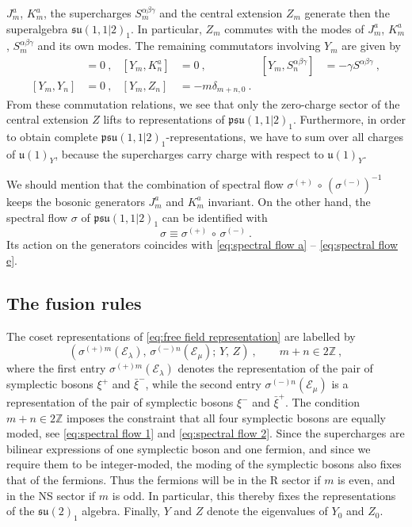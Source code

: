 \documentclass[12pt,a4paper]{article}
\newcommand{\be}{\begin{equation}}
\newcommand{\ee}{\end{equation}}
\begin{document}
$J^a_m$, $K^a_m$, the supercharges $S^{\alpha\beta\gamma}_m$ and the central extension $Z_m$ generate then the superalgebra $\mathfrak{su}(1,1|2)_1$. In particular, $Z_m$ commutes with the modes of $J^a_m$, $K^a_m$, $S^{\alpha\beta\gamma}_m$ and its own modes.
The remaining commutators involving $Y_m$ are given by
\begin{align}
[Y_m,J^a_n]&=0\ , & [Y_m,K^a_n]&=0\ , & [Y_m,S^{\alpha\beta\gamma}_n]&=-\gamma S^{\alpha\beta\gamma}\ , \\
[Y_m,Y_n]&=0\ , & [Y_m,Z_n]&=-m \delta_{m+n,0}\ .
\end{align}
From these commutation relations, we see that only the zero-charge sector of the central extension $Z$ lifts to representations of $\mathfrak{psu}(1,1|2)_1$. Furthermore, in order to obtain complete $\mathfrak{psu}(1,1|2)_1$-representations, we have to sum over all charges of $\mathfrak{u}(1)_Y$, because the supercharges carry charge with respect to $\mathfrak{u}(1)_Y$.

We should mention that the combination of spectral flow $\sigma^{(+)}\, \circ\, (\sigma^{(-)})^{-1}$ keeps the bosonic generators $J^a_m$ and $K^a_m$ invariant. On the other hand, the spectral flow $\sigma$ of  $\mathfrak{psu}(1,1|2)_1$ can be identified with 
\be
\sigma \equiv \sigma^{(+)}\, \circ\,\sigma^{(-)}\ . 
\ee
Its action on the generators coincides with \eqref{eq:spectral flow a} -- \eqref{eq:spectral flow e}.

\subsection{The fusion rules} \label{subapp:fusion rules}

The coset representations of \eqref{eq:free field representation} are labelled by
\be 
(\sigma^{(+)m}(\mathscr{E}_\lambda),\, \sigma^{(-)n}(\mathscr{E}_\mu);\, Y,\, Z)\ ,\qquad m+n \in 2\mathds{Z}\ ,
\ee
where the first entry $\sigma^{(+)m}(\mathscr{E}_\lambda)$ denotes the representation of the pair of symplectic bosons $\xi^+$ and $\bar{\xi}^-$, while the second entry $\sigma^{(-)n}(\mathscr{E}_\mu)$ is a representation of the pair of symplectic bosons $\xi^-$ and $\bar{\xi}^+$. The condition $m+n \in 2\mathds{Z}$ imposes the constraint that all four symplectic bosons are equally moded, see \eqref{eq:spectral flow 1} and \eqref{eq:spectral flow 2}. Since the supercharges are bilinear expressions of one symplectic boson and one fermion, and since we require them to be integer-moded, the moding of the symplectic bosons also fixes that of the fermions. Thus the fermions will be in the R sector if $m$ is even, and in the NS sector if $m$ is odd. In particular, this thereby fixes the representations of the $\mathfrak{su}(2)_1$ algebra. Finally,  $Y$ and $Z$ denote the eigenvalues of $Y_0$ and $Z_0$. 
\end{document}
